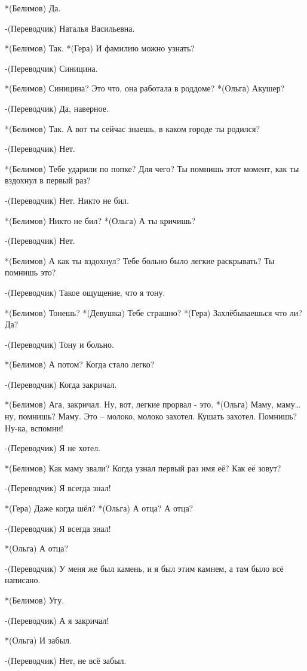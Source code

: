 *(Белимов) Да. 

-(Переводчик) Наталья Васильевна.

*(Белимов) Так.
*(Гера) И фамилию можно узнать?

-(Переводчик) Синицина.

*(Белимов) Синицина? Это что, она работала в роддоме? 
*(Ольга) Акушер? 

-(Переводчик) Да, наверное.

*(Белимов) Так. А вот ты сейчас знаешь, в каком городе ты родился?

-(Переводчик) Нет.

*(Белимов) Тебе ударили по попке? Для чего? Ты помнишь этот момент, как ты вздохнул в первый раз? 

-(Переводчик) Нет. Никто не бил.

*(Белимов) Никто не бил?
*(Ольга) А ты кричишь?

-(Переводчик) Нет. 

*(Белимов) А как ты вздохнул? Тебе больно было легкие раскрывать? Ты помнишь это?

-(Переводчик) Такое ощущение, что я тону.

*(Белимов) Тонешь?
*(Девушка) Тебе страшно?
*(Гера) Захлёбываешься что ли? Да?

-(Переводчик) Тону и больно.

*(Белимов) А потом? Когда стало легко?

-(Переводчик) Когда закричал.

*(Белимов) Ага, закричал. Ну, вот, легкие прорвал - это.
*(Ольга) Маму, маму… ну, помнишь? Маму.  Это – молоко, молоко захотел. Кушать захотел. Помнишь? Ну-ка, вспомни!

-(Переводчик) Я не хотел.

*(Белимов) Как маму звали? Когда узнал первый раз имя её? Как её зовут?

-(Переводчик) Я всегда знал!

*(Гера) Даже когда шёл?
*(Ольга) А отца? А отца?

-(Переводчик) Я всегда знал!

*(Ольга) А отца?

-(Переводчик) У меня же был камень, и я был этим камнем, а там было всё написано.

*(Белимов) Угу.

-(Переводчик) А я закричал!  

*(Ольга) И забыл.

-(Переводчик) Нет, не всё забыл.

